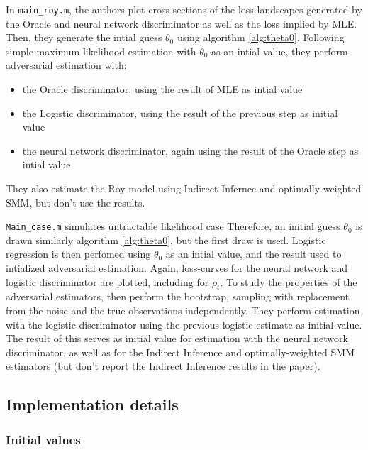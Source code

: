 In \texttt{main\_roy.m}, the authors plot cross-sections of the loss landscapes generated by the Oracle and neural network discriminator as well as the loss implied by MLE. %
Then, they generate the intial guess $\theta_0$ using algorithm \ref{alg:theta0}.
Following simple maximum likelihood estimation with $\theta_0$ as an intial value, they perform adversarial estimation with:
\begin{itemize}
    \item the Oracle discriminator, using the result of MLE as intial value
    \item the Logistic discriminator, using the result of the previous step as initial value
    \item the neural network discriminator, again using the result of the Oracle step as intial value
\end{itemize} 
They also estimate the Roy model using Indirect Infernce and optimally-weighted SMM, but don't use the results.

\texttt{Main\_case.m} simulates untractable likelihood case
Therefore, an initial guess $\theta_0$ is drawn similarly algorithm \ref{alg:theta0}, but the first draw is used.
Logistic regression is then perfomed using $\theta_0$ as an intial value, and the result used to intialized adversarial estimation. %
Again, loss-curves for the neural network and logistic discriminator are plotted, including for $\rho_t$.
To study the properties of the adversarial estimators, \textcite{kaji2023adversarial} then perform the bootstrap, sampling with replacement from the noise and the true observations independently.
They perform estimation with the logistic discriminator using the previous logistic estimate as initial value.
The result of this serves as initial value for estimation with the neural network discriminator, as well as for the Indirect Inference and optimally-weighted SMM estimators (but don't report the Indirect Inference results in the paper). %



\subsection{Implementation details}
\label{sec:Implementation}

\subsubsection{Initial values}
\label{sec:initial_values}

